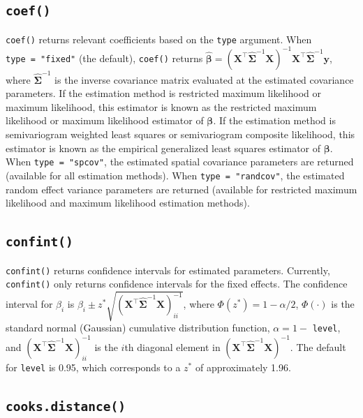 \documentclass{article}
\begin{document}
\hypertarget{coef}{%
\subsection{\texorpdfstring{\texttt{coef()}}{coef()}}\label{coef}}

\texttt{coef()} returns relevant coefficients based on the \texttt{type}
argument. When \texttt{type\ =\ "fixed"} (the default), \texttt{coef()}
returns
\(\hat{\boldsymbol{\beta}} = (\mathbf{X}^\intercal \hat{\boldsymbol{\Sigma}}^{-1} \mathbf{X})^{-1}\mathbf{X}^\intercal \hat{\boldsymbol{\Sigma}}^{-1} \mathbf{y}\),
where \(\hat{\boldsymbol{\Sigma}}^{-1}\) is the inverse covariance
matrix evaluated at the estimated covariance parameters. If the
estimation method is restricted maximum likelihood or maximum
likelihood, this estimator is known as the restricted maximum likelihood
or maximum likelihood estimator of \(\boldsymbol{\beta}\). If the
estimation method is semivariogram weighted least squares or
semivariogram composite likelihood, this estimator is known as the
empirical generalized least squares estimator of \(\boldsymbol{\beta}\).
When \texttt{type\ =\ "spcov"}, the estimated spatial covariance
parameters are returned (available for all estimation methods). When
\texttt{type\ =\ "randcov"}, the estimated random effect variance
parameters are returned (available for restricted maximum likelihood and
maximum likelihood estimation methods).

\hypertarget{confint}{%
\subsection{\texorpdfstring{\texttt{confint()}}{confint()}}\label{confint}}

\texttt{confint()} returns confidence intervals for estimated
parameters. Currently, \texttt{confint()} only returns confidence
intervals for the fixed effects. The confidence interval for \(\beta_i\)
is
\(\beta_i \pm z^* \sqrt{(\mathbf{X}^\intercal \hat{\boldsymbol{\Sigma}}^{-1} \mathbf{X})^{-1}_{ii}}\),
where \(\Phi(z^*) = 1 - \alpha / 2\), \(\Phi(\cdot)\) is the standard
normal (Gaussian) cumulative distribution function, \(\alpha = 1 -\)
\texttt{level}, and
\((\mathbf{X}^\intercal \hat{\boldsymbol{\Sigma}}^{-1} \mathbf{X})^{-1}_{ii}\)
is the \(i\)th diagonal element in
\((\mathbf{X}^\intercal \hat{\boldsymbol{\Sigma}}^{-1} \mathbf{X})^{-1}\).
The default for \texttt{level} is 0.95, which corresponds to a \(z^*\)
of approximately 1.96.

\hypertarget{cooks.distance}{%
\subsection{\texorpdfstring{\texttt{cooks.distance()}}{cooks.distance()}}\label{cooks.distance}}
\end{document}
